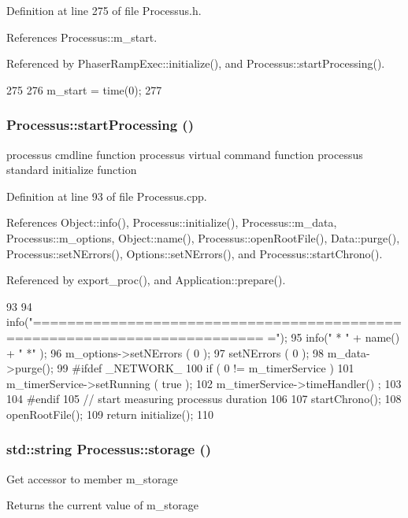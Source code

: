 Definition at line 275 of file Processus.h.

References Processus::m\_\-start.

Referenced by PhaserRampExec::initialize(), and Processus::startProcessing().


\begin{DoxyCode}
275                     {
276     m_start = time(0);
277   }
\end{DoxyCode}
\hypertarget{classProcessus_a09319bde9bed93e290f69b4e04585543}{
\subsubsection[{startProcessing}]{ Processus::startProcessing ()}}
\label{classProcessus_a09319bde9bed93e290f69b4e04585543}
processus cmdline function processus virtual command function processus standard initialize function 

Definition at line 93 of file Processus.cpp.

References Object::info(), Processus::initialize(), Processus::m\_\-data, Processus::m\_\-options, Object::name(), Processus::openRootFile(), Data::purge(), Processus::setNErrors(), Options::setNErrors(), and Processus::startChrono().

Referenced by export\_\-proc(), and Application::prepare().


\begin{DoxyCode}
93                                       {
94   info("=========================================================================
      =");
95   info("   * " + name() + " *" );
96   m_options->setNErrors ( 0 );
97   setNErrors ( 0 );
98   m_data->purge();
99 #ifdef _NETWORK_
100   if ( 0 != m_timerService ){
101     m_timerService->setRunning ( true );
102     m_timerService->timeHandler() ;
103   }
104 #endif
105   // start measuring processus duration
106   
107   startChrono();
108   openRootFile();
109   return initialize();
110 }
\end{DoxyCode}
\hypertarget{classProcessus_a33fa1a0b54a636e5cdd680669fd9ea51}{
\subsubsection[{storage}]{\setlength{\rightskip}{0pt plus 5cm}std::string Processus::storage ()}}
\label{classProcessus_a33fa1a0b54a636e5cdd680669fd9ea51}
Get accessor to member m\_\-storage \begin{DoxyReturn}{Returns}
the current value of m\_\-storage 
\end{DoxyReturn}


